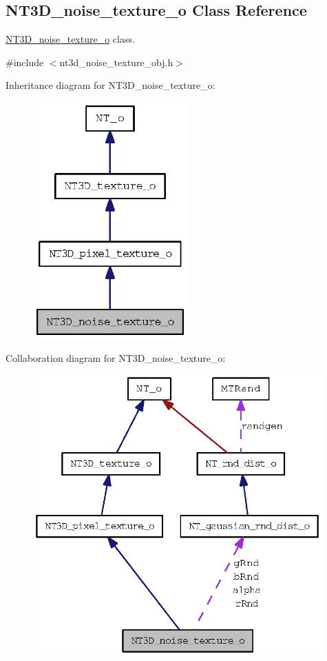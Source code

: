 \subsection{NT3D\_\-noise\_\-texture\_\-o Class Reference}
\label{class_n_t3_d__noise__texture__o}


\hyperlink{class_n_t3_d__noise__texture__o}{NT3D\_\-noise\_\-texture\_\-o} class.  




{\ttfamily \#include $<$nt3d\_\-noise\_\-texture\_\-obj.h$>$}



Inheritance diagram for NT3D\_\-noise\_\-texture\_\-o:
\nopagebreak
\begin{figure}[H]
\begin{center}
\leavevmode
\includegraphics[width=168pt]{class_n_t3_d__noise__texture__o__inherit__graph}
\end{center}
\end{figure}


Collaboration diagram for NT3D\_\-noise\_\-texture\_\-o:
\nopagebreak
\begin{figure}[H]
\begin{center}
\leavevmode
\includegraphics[width=314pt]{class_n_t3_d__noise__texture__o__coll__graph}
\end{center}
\end{figure}
